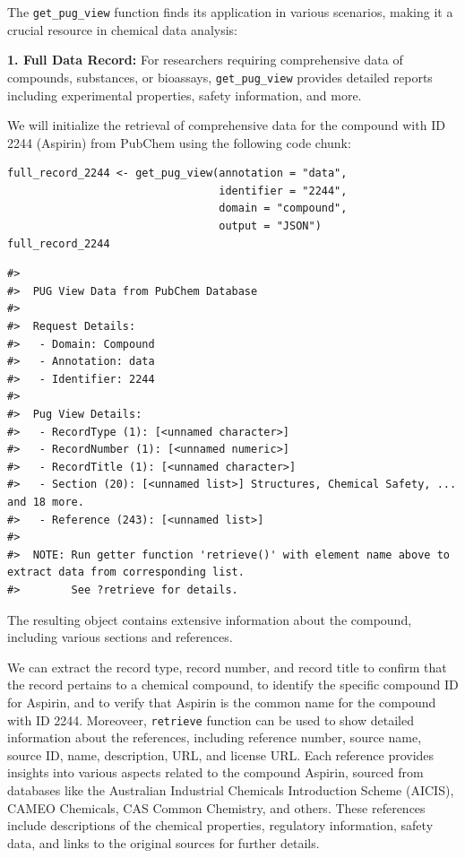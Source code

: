 The \texttt{get\_pug\_view} function finds its application in various scenarios, making it a crucial resource in chemical data analysis:

\textbf{1. Full Data Record:} For researchers requiring comprehensive data of compounds, substances, or bioassays, \texttt{get\_pug\_view} provides detailed reports including experimental properties, safety information, and more.

We will initialize the retrieval of comprehensive data for the compound with ID 2244 (Aspirin) from PubChem using the following code chunk:

\begin{verbatim}
full_record_2244 <- get_pug_view(annotation = "data", 
                                 identifier = "2244", 
                                 domain = "compound", 
                                 output = "JSON") 
full_record_2244
\end{verbatim}

\begin{verbatim}
#> 
#>  PUG View Data from PubChem Database 
#> 
#>  Request Details:  
#>   - Domain: Compound
#>   - Annotation: data
#>   - Identifier: 2244
#> 
#>  Pug View Details: 
#>   - RecordType (1): [<unnamed character>] 
#>   - RecordNumber (1): [<unnamed numeric>] 
#>   - RecordTitle (1): [<unnamed character>] 
#>   - Section (20): [<unnamed list>] Structures, Chemical Safety, ... and 18 more.
#>   - Reference (243): [<unnamed list>] 
#> 
#>  NOTE: Run getter function 'retrieve()' with element name above to extract data from corresponding list. 
#>        See ?retrieve for details.
\end{verbatim}

The resulting object contains extensive information about the compound, including various sections and references.

We can extract the record type, record number, and record title to confirm that the record pertains to a chemical compound, to identify the specific compound ID for Aspirin, and to verify that Aspirin is the common name for the compound with ID 2244. Moreoveer, \texttt{retrieve} function can be used to show detailed information about the references, including reference number, source name, source ID, name, description, URL, and license URL. Each reference provides insights into various aspects related to the compound Aspirin, sourced from databases like the Australian Industrial Chemicals Introduction Scheme (AICIS), CAMEO Chemicals, CAS Common Chemistry, and others. These references include descriptions of the chemical properties, regulatory information, safety data, and links to the original sources for further details.

